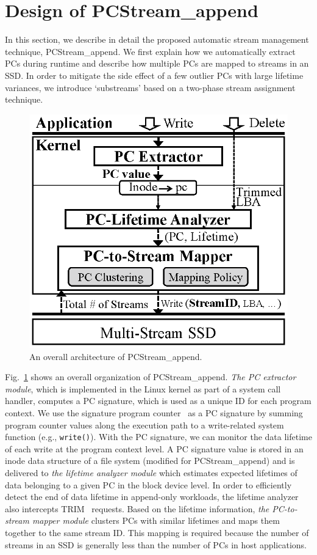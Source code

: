 \section{Design of \textsf{PCStream\_append}}
In this section, we describe in detail the proposed automatic stream management technique, %
\textsf{\small PCStream\_append}.  We first explain how we automatically extract PCs during
runtime and describe how multiple PCs are mapped to streams in an SSD.
In order to mitigate the side effect of a few outlier PCs with large lifetime variances, 
we introduce `substreams' based on a two-phase
stream assignment technique.

\begin{figure}[t]
	\centering
	\includegraphics[width=0.6\linewidth]{figure/pcstream_/architecture4}
	\caption{An overall architecture of \textsf{\small PCStream\_append}.}
	\label{fig:architecture_}
\end{figure}

Fig.~\ref{fig:architecture_} shows an overall organization of \textsf{\small PCStream\_append}.
\textit{The PC extractor module}, which is implemented in the Linux kernel as
part of a system call handler, 
computes a PC signature, which is used as a unique ID for each program context.  
We use the signature program counter~\cite{PC} as a PC signature 
by summing program counter values along the execution path to a write-related system function 
(e.g., {\tt write()}).  
With the PC signature, we can monitor the data lifetime of each write at the program context level. 
A PC signature value is stored
in an inode data structure of a file system (modified for \textsf{\small PCStream\_append})
and is delivered to \textit{the lifetime analyzer module} which estimates
expected lifetimes of data belonging to a given PC in the block device level.
In order to efficiently detect the end of data lifetime in append-only
workloads, the lifetime analyzer also intercepts TRIM~\cite{TRIM} requests. %
Based on the lifetime information, \textit{the PC-to-stream
mapper module} clusters PCs with similar lifetimes and maps them together to
the same stream ID.  This mapping is required because 
the number of streams in an SSD is generally less than the number of PCs in host applications.

